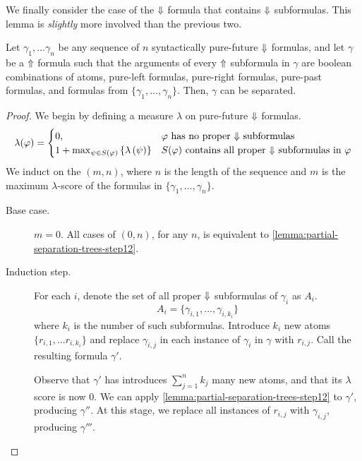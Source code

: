 \documentclass[a4paper,UKenglish,cleveref, autoref, thm-restate, numberwithinsect]{lipics-v2021}
\def\Uarrow{\ensuremath\mathord{\Uparrow}}
\def\Darrow{\ensuremath\mathord{\Downarrow}}
\begin{document}
We finally consider the case of the $\Darrow$ formula that contains $\Darrow$ subformulas. This lemma is \textit{slightly} more involved than the previous two.
\begin{lemma}
    \label{lemma:partial-separation-trees-step13}
    Let $\gamma_1, \ldots \gamma_n$ be any sequence of $n$ syntactically pure-future $\Darrow$ formulas, and let $\gamma$ be a $\Uarrow$ formula such that the arguments of every $\Uarrow$ subformula in $\gamma$ are boolean combinations of atoms, pure-left formulas, pure-right formulas, pure-past formulas, and formulas from $\{\gamma_1, \ldots, \gamma_n\}$. Then, $\gamma$ can be separated.
\end{lemma}
\begin{proof}
    We begin by defining a measure $\lambda$ on pure-future $\Darrow$ formulas.
    \begin{equation*}
        \lambda(\varphi) = \begin{cases}
            0, & \text{$\varphi$ has no proper $\Darrow$ subformulas}\\
            1 + \max_{\psi \in S(\varphi)} \left\{\lambda\left(\psi\right)\right\} & \text{$S(\varphi)$ contains all proper $\Darrow$ subformulas in $\varphi$}
        \end{cases}
    \end{equation*}
    We induct on the $(m, n)$, where $n$ is the length of the sequence and $m$ is the maximum $\lambda$-score of the formulas in $\{\gamma_1, \ldots, \gamma_n\}$.

    \begin{description}
        \item[Base case.] $m = 0$. All cases of $(0, n)$, for any $n$, is equivalent to \cref{lemma:partial-separation-trees-step12}.
        \item[Induction step.] For each $i$, denote the set of all proper $\Darrow$ subformulas of $\gamma_i$ as $A_i$.
        \begin{equation*}
            A_i = \{ \gamma_{i, 1}, \ldots, \gamma_{i, k_i} \}
        \end{equation*}
        where $k_i$ is the number of such subformulas. Introduce $k_i$ new atoms $\{r_{i, 1}, \ldots r_{i, k_i}\}$ and replace $\gamma_{i, j}$ in each instance of $\gamma_i$ in $\gamma$ with $r_{i, j}$. Call the resulting formula $\gamma'$.

        Observe that $\gamma'$ has introduces $\sum_{j = 1}^{n} k_j$ many new atoms, and that its $\lambda$ score is now 0. We can apply \cref{lemma:partial-separation-trees-step12} to $\gamma'$, producing $\gamma''$. At this stage, we replace all instances of $r_{i, j}$ with $\gamma_{i, j}$, producing $\gamma'''$.


\end{description}
\end{proof}
\end{document}
